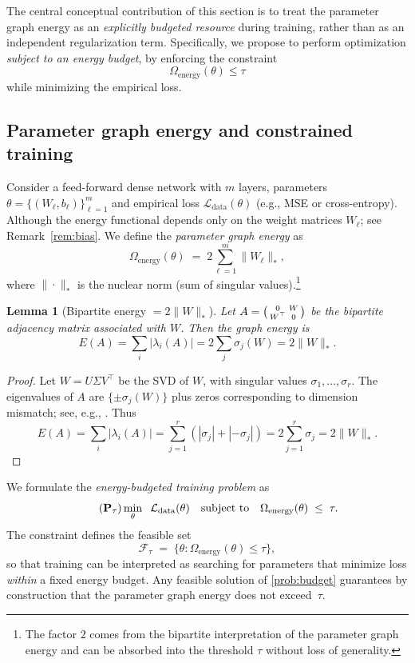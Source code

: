 \documentclass[a4paper,fleqn]{cas-sc}
\newtheorem{lemma}[theorem]{Lemma}
\theoremstyle{remark}
\theoremstyle{definition}
\begin{document}
The central conceptual contribution of this section is to treat the parameter graph energy as an \emph{explicitly budgeted resource} during training, rather than as an independent regularization term. Specifically, we propose to perform optimization \emph{subject to an energy budget}, by enforcing the constraint
\[
\Omega_{\text{energy}}(\theta)\le \tau
\]
while minimizing the empirical loss.
\subsection{Parameter graph energy and constrained training}

Consider a feed-forward dense network with $m$ layers, parameters $\theta=\{(W_\ell,b_\ell)\}_{\ell=1}^m$ and empirical loss $\mathcal{L}_{\text{data}}(\theta)$ (e.g., MSE or cross-entropy). Although the energy functional depends only on the weight matrices $W_\ell$; see Remark~\ref{rem:bias}.
We define the \emph{parameter graph energy} as
\begin{equation}
  \Omega_{\text{energy}}(\theta)\;=\;2\sum_{\ell=1}^m \|W_\ell\|_{\ast},
\end{equation}
where $\|\cdot\|_{\ast}$ is the nuclear norm (sum of singular values).\footnote{The factor $2$ comes from the bipartite interpretation of the parameter graph energy and can be absorbed into the threshold $\tau$ without loss of generality.}

\begin{lemma}[Bipartite energy $= 2\|W\|_\ast$]
\label{lem:bipartita-nuclear}
Let $A=\begin{psmallmatrix}0&W\\ W^\top&0\end{psmallmatrix}$ be the bipartite adjacency matrix associated with $W$. 
Then the graph energy is
\[
E(A)=\sum_i |\lambda_i(A)| = 2\sum_j \sigma_j(W)=2\|W\|_\ast.
\]
\end{lemma}

\begin{proof}
Let $W = U \Sigma V^\top$ be the SVD of $W$, with singular values $\sigma_1,\dots,\sigma_r$. The eigenvalues of $A$ are $\{\pm \sigma_j(W)\}$ plus zeros corresponding to dimension mismatch; see, e.g., \cite[Ch.~3]{HornJohnson2012,Parlett1998}. Thus
\[
E(A)=\sum_i|\lambda_i(A)|=\sum_{j=1}^r(|\sigma_j|+|-\sigma_j|)=2\sum_{j=1}^r \sigma_j=2\|W\|_\ast.
\]
\end{proof}

We formulate the \emph{energy-budgeted training problem} as
\begin{equation}
  \tag{$\mathbf{P}_\tau$}\label{prob:budget}
  \min_{\theta}\;\;\mathcal{L}_{\text{data}}(\theta)
  \quad\text{subject to}\quad
  \Omega_{\text{energy}}(\theta)\;\le\;\tau.
\end{equation}
The constraint defines the feasible set
\[
  \mathcal{F}_\tau 
    \;=\; 
    \bigl\{ \theta : \Omega_{\text{energy}}(\theta) \le \tau \bigr\},
\]
so that training can be interpreted as searching for parameters that minimize loss \emph{within} a fixed energy budget. Any feasible solution of \eqref{prob:budget} guarantees by construction that the parameter graph energy does not exceed~$\tau$.
\end{document}
